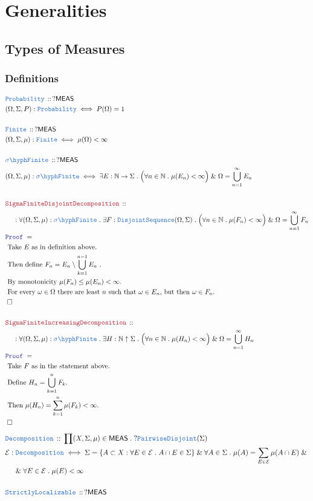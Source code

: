 \documentclass[12pt]{scrartcl}
\newcommand{\TYPE}[1]{\textcolor{NavyBlue}{\mathtt{#1}}}
\newcommand{\LOGIC}[1]{\textcolor{Blue}{\mathtt{#1}}}
\newcommand{\THM}[1]{\textcolor{Maroon}{\mathtt{#1}}}
\renewcommand{\.}{\; . \;}
\newcommand{\Theorem}[2]{& \THM{#1} \, :: \, #2 \\ & \Proof = \\ }
\newcommand{\DeclareType}[2]{& \TYPE{#1} \, :: \, #2 \\}
\newcommand{\DefineType}[3]{& #1 : \TYPE{#2} \iff #3 \\}
\newcommand{\NewLine}{\\ & \kern 1pc}
\newcommand{\Page}[1]{ \begin{align*} #1 \end{align*}   }
\renewcommand{\And}{\; \& \;}
\newcommand{\Nat}{\mathbb{N} }
\newcommand{\QED}{\; \square}
\newcommand{\EndProof}{& \QED \\}
\newcommand{\Proof}{\LOGIC{Proof} \; }
\newcommand{\Explain}[1]{& \text{#1.} \\}
\newcommand{\sFinite}{\TYPE{\sigma \hyph  Finite}}
\newcommand{\MEAS}{\mathsf{MEAS}}
\begin{document}
\section{Generalities}
\subsection{Types of Measures}
\subsubsection{Definitions}
\Page{
	\DeclareType{Probability}
	{
		? \MEAS
	}
	\DefineType{(\Omega,\Sigma,P)}{Probability}{P(\Omega) = 1}
	\\
	\DeclareType{Finite}
	{
		? \MEAS
	}
	\DefineType{(\Omega,\Sigma,\mu)}{Finite}{\mu(\Omega) < \infty}
	\\
	\DeclareType{\sFinite}
	{
		? \MEAS
	}
	\DefineType{(\Omega,\Sigma,\mu)}{\sFinite}{
		\exists E : \Nat \to \Sigma \. 
		\Big(\forall n \in \Nat \. \mu(E_n) < \infty\Big)
		\And
		\Omega = \bigcup^\infty_{n=1} E_n
	}
	\\
	\Theorem{SigmaFiniteDisjointDecomposition}
	{
		\NewLine :		
		\forall (\Omega,\Sigma,\mu) : \sFinite \.
		\exists F : \TYPE{DisjointSequence}(\Omega,\Sigma) \.
		\Big(\forall n \in \Nat \. \mu(F_n) < \infty\Big)
		\And
		\Omega = \bigcup^\infty_{n=1} F_n
	}
	\Explain{
		Take $E$ as in definition above}
	\Explain{
		Then define $F_n = E_n \setminus \bigcup^{n-1}_{k=1} E_n $	
	}
	\Explain{
		By monotonicity $\mu(F_n) \le \mu(E_n) < \infty$}
	\Explain{
		For every $\omega \in \Omega$ there are least $n$ such that $\omega \in E_n$, 
		but then $\omega \in F_n$}
	\EndProof
	\\
	\Theorem{SigmaFiniteIncreasingDecomposition}
	{
		\NewLine :		
		\forall (\Omega,\Sigma,\mu) : \sFinite \.
		\exists H : \Nat \uparrow \Sigma \.
		\Big(\forall n \in \Nat \. \mu(H_n) < \infty\Big)
		\And
		\Omega = \bigcup^\infty_{n=1} H_n
	}
	\Explain{ 
		Take $F$ as in the statement above}
	\Explain{
		Define $H_n = \bigcup^n_{k=1} F_k$}
	\Explain{
		Then $\mu(H_n) = \sum^n_{k=1} \mu(F_k) < \infty$}
	\EndProof
}\Page{
	\DeclareType{Decomposition}{\prod (X,\Sigma,\mu) \in \MEAS \. ?\TYPE{PairwiseDisjoint}(\Sigma)}
	\DefineType{\mathcal{E}}{Decomposition}
	{
		\Sigma = \{ A \subset X : \forall E \in \mathcal{E} \. A \cap E \in \Sigma   \}
		\And
		\forall A \in \Sigma \. 
		\mu(A) = \sum_{E \in \mathcal{E}} \mu(A \cap E)
		\And \NewLine \And
		\forall E \in \mathcal{E} \. \mu(E) < \infty
	}
	\\
	\DeclareType{StrictlyLocalizable}{?\MEAS}
}
\end{document}
